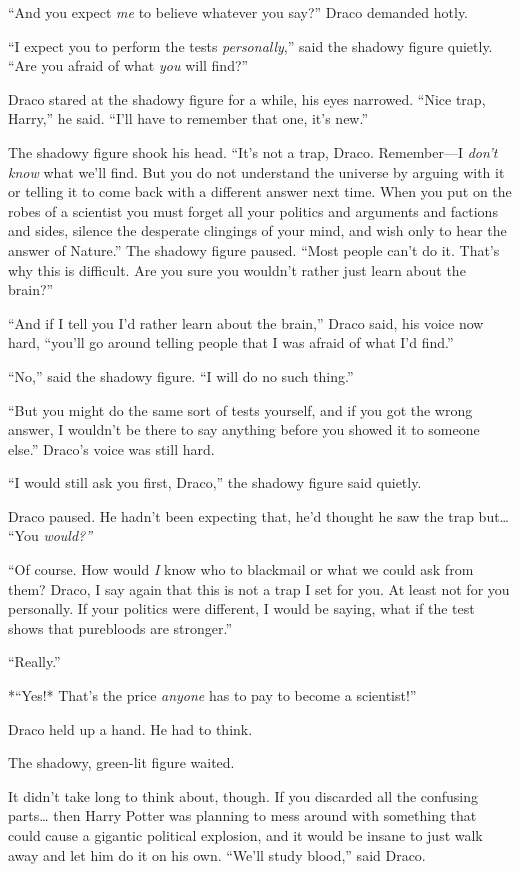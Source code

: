 ``And you expect \emph{me} to believe whatever you say?'' Draco demanded
hotly.

``I expect you to perform the tests \emph{personally},'' said the
shadowy figure quietly. ``Are you afraid of what \emph{you} will find?''

Draco stared at the shadowy figure for a while, his eyes narrowed.
``Nice trap, Harry,'' he said. ``I'll have to remember that one, it's
new.''

The shadowy figure shook his head. ``It's not a trap, Draco.
Remember---I \emph{don't know} what we'll find. But you do not
understand the universe by arguing with it or telling it to come back
with a different answer next time. When you put on the robes of a
scientist you must forget all your politics and arguments and factions
and sides, silence the desperate clingings of your mind, and wish only
to hear the answer of Nature.'' The shadowy figure paused. ``Most people
can't do it. That's why this is difficult. Are you sure you wouldn't
rather just learn about the brain?''

``And if I tell you I'd rather learn about the brain,'' Draco said, his
voice now hard, ``you'll go around telling people that I was afraid of
what I'd find.''

``No,'' said the shadowy figure. ``I will do no such thing.''

``But you might do the same sort of tests yourself, and if you got the
wrong answer, I wouldn't be there to say anything before you showed it
to someone else.'' Draco's voice was still hard.

``I would still ask you first, Draco,'' the shadowy figure said quietly.

Draco paused. He hadn't been expecting that, he'd thought he saw the
trap but\ldots{} ``You \emph{would?''}

``Of course. How would \emph{I} know who to blackmail or what we could
ask from them? Draco, I say again that this is not a trap I set for you.
At least not for you personally. If your politics were different, I
would be saying, what if the test shows that purebloods are stronger.''

``Really.''

*``Yes!* That's the price \emph{anyone} has to pay to become a
scientist!''

Draco held up a hand. He had to think.

The shadowy, green-lit figure waited.

It didn't take long to think about, though. If you discarded all the
confusing parts\ldots{} then Harry Potter was planning to mess around
with something that could cause a gigantic political explosion, and it
would be insane to just walk away and let him do it on his own. ``We'll
study blood,'' said Draco.

